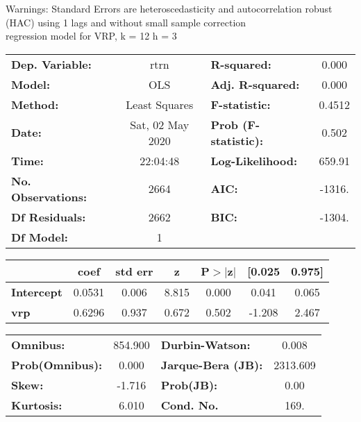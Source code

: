 Warnings: \newline
 [1] Standard Errors are heteroscedasticity and autocorrelation robust (HAC) using 1 lags and without small sample correction\\ 

regression model for VRP, k = 12 h = 3\begin{center}
\begin{tabular}{lclc}
\toprule
\textbf{Dep. Variable:}    &       rtrn       & \textbf{  R-squared:         } &     0.000   \\
\textbf{Model:}            &       OLS        & \textbf{  Adj. R-squared:    } &     0.000   \\
\textbf{Method:}           &  Least Squares   & \textbf{  F-statistic:       } &    0.4512   \\
\textbf{Date:}             & Sat, 02 May 2020 & \textbf{  Prob (F-statistic):} &    0.502    \\
\textbf{Time:}             &     22:04:48     & \textbf{  Log-Likelihood:    } &    659.91   \\
\textbf{No. Observations:} &        2664      & \textbf{  AIC:               } &    -1316.   \\
\textbf{Df Residuals:}     &        2662      & \textbf{  BIC:               } &    -1304.   \\
\textbf{Df Model:}         &           1      & \textbf{                     } &             \\
\bottomrule
\end{tabular}
\begin{tabular}{lcccccc}
                   & \textbf{coef} & \textbf{std err} & \textbf{z} & \textbf{P$> |$z$|$} & \textbf{[0.025} & \textbf{0.975]}  \\
\midrule
\textbf{Intercept} &       0.0531  &        0.006     &     8.815  &         0.000        &        0.041    &        0.065     \\
\textbf{vrp}       &       0.6296  &        0.937     &     0.672  &         0.502        &       -1.208    &        2.467     \\
\bottomrule
\end{tabular}
\begin{tabular}{lclc}
\textbf{Omnibus:}       & 854.900 & \textbf{  Durbin-Watson:     } &    0.008  \\
\textbf{Prob(Omnibus):} &   0.000 & \textbf{  Jarque-Bera (JB):  } & 2313.609  \\
\textbf{Skew:}          &  -1.716 & \textbf{  Prob(JB):          } &     0.00  \\
\textbf{Kurtosis:}      &   6.010 & \textbf{  Cond. No.          } &     169.  \\
\bottomrule
\end{tabular}
\end{center}

